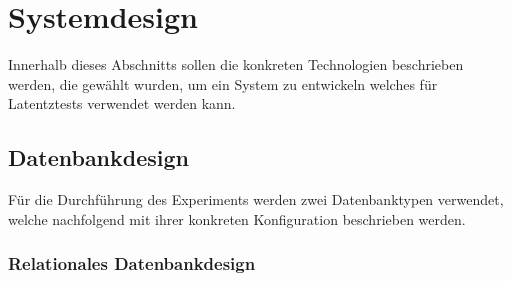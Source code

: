 \chapter{Systemdesign} %
\label{sec:systemdesign}
Innerhalb dieses Abschnitts sollen die konkreten Technologien beschrieben werden, die gewählt wurden, um ein System zu entwickeln welches für Latentztests verwendet werden kann.
\section{Datenbankdesign} %
Für die Durchführung des Experiments werden zwei Datenbanktypen verwendet, welche nachfolgend mit ihrer konkreten Konfiguration beschrieben werden.
\label{sec:datenbankdesign}
\subsection{Relationales Datenbankdesign} %
\label{sec:relationalesdatenbankdesign}

